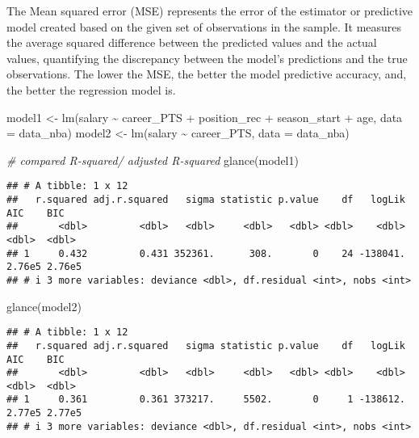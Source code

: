 \documentclass[
]{book}
\newenvironment{Shaded}{\begin{snugshade}}{\end{snugshade}}
\newcommand{\AttributeTok}[1]{\textcolor[rgb]{0.77,0.63,0.00}{#1}}
\newcommand{\AttributeTok}[1]{\textcolor[rgb]{0.13,0.29,0.53}{#1}}
\newcommand{\CommentTok}[1]{\textcolor[rgb]{0.56,0.35,0.01}{\textit{#1}}}
\newcommand{\FunctionTok}[1]{\textcolor[rgb]{0.00,0.00,0.00}{#1}}
\newcommand{\FunctionTok}[1]{\textcolor[rgb]{0.13,0.29,0.53}{\textbf{#1}}}
\newcommand{\NormalTok}[1]{#1}
\newcommand{\OtherTok}[1]{\textcolor[rgb]{0.56,0.35,0.01}{#1}}
\newcommand{\SpecialCharTok}[1]{\textcolor[rgb]{0.00,0.00,0.00}{#1}}
\newcommand{\SpecialCharTok}[1]{\textcolor[rgb]{0.81,0.36,0.00}{\textbf{#1}}}
\begin{document}
The Mean squared error (MSE) represents the error of the estimator or predictive model created based on the given set of observations in the sample. It measures the average squared difference between the predicted values and the actual values, quantifying the discrepancy between the model's predictions and the true observations. The lower the MSE, the better the model predictive accuracy, and, the better the regression model is.

\begin{Shaded}
\begin{Highlighting}[]
\NormalTok{model1 }\OtherTok{\textless{}{-}} \FunctionTok{lm}\NormalTok{(salary }\SpecialCharTok{\textasciitilde{}}\NormalTok{ career\_PTS }\SpecialCharTok{+}\NormalTok{ position\_rec }\SpecialCharTok{+}\NormalTok{ season\_start }\SpecialCharTok{+}
\NormalTok{             age, }\AttributeTok{data =}\NormalTok{ data\_nba)}
\NormalTok{model2 }\OtherTok{\textless{}{-}} \FunctionTok{lm}\NormalTok{(salary }\SpecialCharTok{\textasciitilde{}}\NormalTok{ career\_PTS, }\AttributeTok{data =}\NormalTok{ data\_nba)}

\CommentTok{\# compared R{-}squared/ adjusted R{-}squared}
\FunctionTok{glance}\NormalTok{(model1)}
\end{Highlighting}
\end{Shaded}

\begin{verbatim}
## # A tibble: 1 x 12
##   r.squared adj.r.squared   sigma statistic p.value    df   logLik    AIC    BIC
##       <dbl>         <dbl>   <dbl>     <dbl>   <dbl> <dbl>    <dbl>  <dbl>  <dbl>
## 1     0.432         0.431 352361.      308.       0    24 -138041. 2.76e5 2.76e5
## # i 3 more variables: deviance <dbl>, df.residual <int>, nobs <int>
\end{verbatim}

\begin{Shaded}
\begin{Highlighting}[]
\FunctionTok{glance}\NormalTok{(model2)}
\end{Highlighting}
\end{Shaded}

\begin{verbatim}
## # A tibble: 1 x 12
##   r.squared adj.r.squared   sigma statistic p.value    df   logLik    AIC    BIC
##       <dbl>         <dbl>   <dbl>     <dbl>   <dbl> <dbl>    <dbl>  <dbl>  <dbl>
## 1     0.361         0.361 373217.     5502.       0     1 -138612. 2.77e5 2.77e5
## # i 3 more variables: deviance <dbl>, df.residual <int>, nobs <int>
\end{verbatim}
\end{document}
